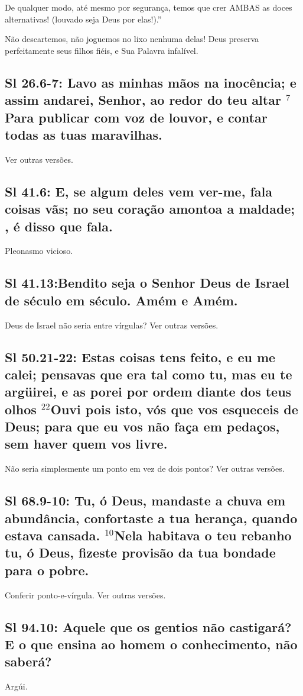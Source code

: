 De qualquer modo, até mesmo por segurança, temos que crer AMBAS as doces alternativas! (louvado seja Deus por elas!).''

Não descartemos, não joguemos no lixo nenhuma delas! Deus preserva perfeitamente seus filhos fiéis, e Sua Palavra infalível.

\subsection{Sl 26.6-7: Lavo as minhas mãos na inocência; e assim andarei, Senhor, ao redor do teu altar $^{\mathrm{7}}$Para publicar com voz de louvor, e contar todas as tuas maravilhas.}
Ver outras versões. 

\subsection{Sl 41.6: E, se algum deles vem ver-me, fala coisas vãs; no seu coração amontoa a maldade; , é disso que fala.}
Pleonasmo vicioso.

\subsection{Sl 41.13:Bendito seja o Senhor Deus de Israel de século em século. Amém e Amém.}
Deus de Israel não seria entre vírgulas? Ver outras versões. 

\subsection{Sl 50.21-22: Estas coisas tens feito, e eu me calei; pensavas que era tal como tu, mas eu te argüirei, e as porei por ordem diante dos teus olhos\uwave{:} $^{\mathrm{22}}$Ouvi pois isto, vós que vos esqueceis de Deus; para que eu vos não faça em pedaços, sem haver quem vos livre.}
Não seria simplesmente um ponto em vez de dois pontos? Ver outras versões. 

\subsection{Sl 68.9-10: Tu, ó Deus, mandaste a chuva em abundância, confortaste a tua herança, quando estava cansada. $^{\mathrm{10}}$Nela habitava o teu rebanho\uwave{;} tu, ó Deus, fizeste provisão da tua bondade para o pobre.}
Conferir ponto-e-vírgula. Ver outras versões. 

\subsection{Sl 94.10: Aquele que  os gentios não castigará? E o que ensina ao homem o conhecimento, não saberá?}
Argúi.

